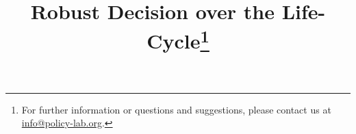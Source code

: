 \title{Robust Decision over the Life-Cycle\thanks{For further information or questions and suggestions, please contact us at \href{mailto: info@policy-lab.org}{info@policy-lab.org}.}}
\author{ }
\date{ } 
\doublespacing
